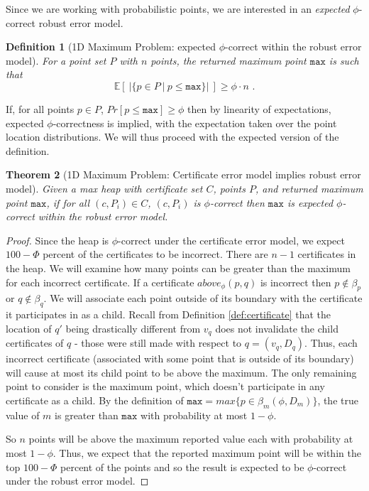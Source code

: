 \documentclass[11pt]{article}
\newtheorem{theorem}{\textbf{Theorem}}[section]
\newtheorem{definition}[theorem]{Definition}
\begin{document}
Since we are working with probabilistic points, we are interested in an \emph{expected} $\phi$-correct robust error model.

\begin{definition}[1D Maximum Problem: expected $\phi$-correct within the robust error model]
For a point set $P$ with $n$ points, the returned maximum point $\texttt{max}$ is such that
\[ \mathbb{E} \left[ ~| \{ p \in P ~|~ p \leq \texttt{max} \} | ~\right] \geq \phi \cdot n \mbox{ .}\]
\end{definition}

\noindent If, for all points $p \in P$, $Pr[p \leq \texttt{max}] \geq \phi$ then by linearity of expectations, expected $\phi$-correctness is implied, with the expectation taken over the point location distributions.  We will thus proceed with the expected version of the definition.


\begin{theorem}[1D Maximum Problem: Certificate error model implies robust error model]
\label{thm:1dmax}
Given a max heap with certificate set $C$, points $P$, and returned maximum point $\texttt{max}$,
if for all $(c,P_i) \in C$, $(c, P_i)$ is $\phi$-correct
then
$\texttt{max}$ is expected $\phi$-correct within the robust error model.
\end{theorem}


\begin{proof}
Since the heap is $\phi$-correct under the certificate error model, we expect $100-\Phi$ percent of the certificates to be incorrect.  There are $n - 1$ 
certificates in the heap.  We will examine how many points can be greater than the maximum for each incorrect certificate.  If a certificate $above_\phi(p,q)$ is incorrect then $p \not\in \beta_p$ or $q \not\in \beta_q$.  We will associate each point outside of its boundary with the certificate it participates in as a child.  Recall from Definition \ref{def:certificate} that the location of $q'$ being drastically different from $v_q$ does not invalidate the child certificates of $q$ - those were still made with respect to $q = (v_q, D_q)$.   
  Thus, each incorrect certificate (associated with some point that is outside of its boundary) will cause at most its child point to be above the maximum.  The only remaining point to consider is the maximum point, which doesn't participate in any certificate as a child.  By the definition of $\texttt{max} = max \{ p \in \beta_m(\phi, D_m) \}$, the true value
  of $m$ is greater than $\texttt{max}$ with probability at most $1 - \phi$.
      
  So $n$ points will be above the maximum reported value each with probability at most $1 - \phi$.  Thus, we expect that the reported
  maximum point will be within the top $100 - \Phi$ percent of the
  points and so the result is expected to be $\phi$-correct under the
  robust error model.
\end{proof}
\end{document}
